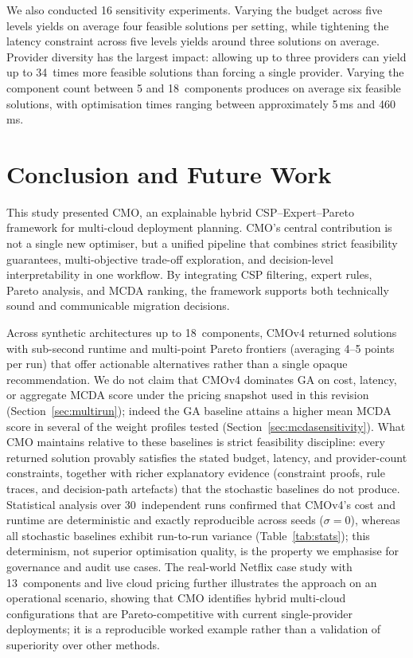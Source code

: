 \documentclass[journal]{IEEEtran}
\newcommand{\cmo}{CMO\xspace}
\newcommand{\cmofour}{CMOv4\xspace}
\begin{document}
We also conducted 16 sensitivity experiments. Varying the budget across five
levels yields on average four feasible solutions per setting, while tightening
the latency constraint across five levels yields around three solutions on
average. Provider diversity has the largest impact: allowing up to three
providers can yield up to 34~times more feasible solutions than forcing a single
provider. Varying the component count between 5 and 18~components produces on
average six feasible solutions, with optimisation times ranging between
approximately 5\,ms and 460\,ms.

\section{Conclusion and Future Work}
\label{sec:conclusion}

This study presented \cmo, an explainable hybrid CSP--Expert--Pareto framework
for multi-cloud deployment planning. \cmo's central contribution is not a single
new optimiser, but a unified pipeline that combines strict feasibility
guarantees, multi-objective trade-off exploration, and decision-level
interpretability in one workflow. By integrating CSP filtering, expert rules,
Pareto analysis, and MCDA ranking, the framework supports both technically sound
and communicable migration decisions.

Across synthetic architectures up to 18~components, \cmofour returned solutions
with sub-second runtime and multi-point Pareto frontiers (averaging 4--5 points
per run) that offer actionable alternatives rather than a single opaque
recommendation. We do not claim that \cmofour dominates GA on cost, latency,
or aggregate MCDA score under the pricing snapshot used in this
revision (Section~\ref{sec:multirun}); indeed the GA baseline attains a higher
mean MCDA score in several of the weight profiles tested
(Section~\ref{sec:mcdasensitivity}). What \cmo maintains relative to these
baselines is strict feasibility discipline: every returned solution
provably satisfies the stated budget, latency, and provider-count
constraints, together with richer explanatory evidence (constraint proofs,
rule traces, and decision-path artefacts) that the stochastic baselines do not
produce. Statistical analysis over 30~independent runs confirmed that
\cmofour's cost and runtime are deterministic and exactly reproducible across
seeds ($\sigma=0$), whereas all stochastic baselines exhibit run-to-run
variance (Table~\ref{tab:stats}); this determinism, not superior optimisation
quality, is the property we emphasise for governance and audit use cases. The
real-world Netflix case study with 13~components and live cloud pricing
further illustrates the approach on an operational scenario, showing that
\cmo identifies hybrid multi-cloud configurations that are Pareto-competitive
with current single-provider deployments; it is a reproducible worked example
rather than a validation of superiority over other methods.
\end{document}
